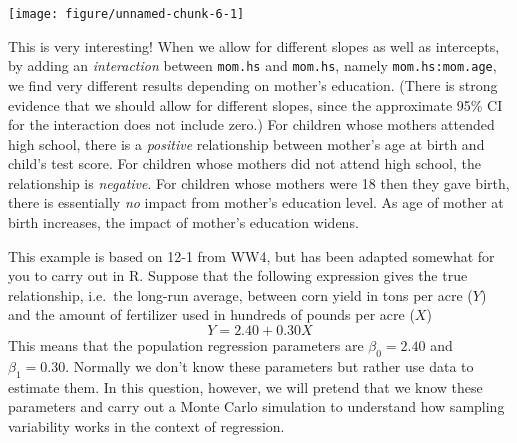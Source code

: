 \documentclass[addpoints,12pt]{exam}\usepackage[]{graphicx}\usepackage[]{color}
\makeatletter
\def\maxwidth{ %
  \ifdim\Gin@nat@width>\linewidth
    \linewidth
  \else
    \Gin@nat@width
  \fi
}
\newcommand{\hlnum}[1]{\textcolor[rgb]{0.686,0.059,0.569}{#1}}%
\newcommand{\hlopt}[1]{\textcolor[rgb]{0,0,0}{#1}}%
\newcommand{\hlstd}[1]{\textcolor[rgb]{0.345,0.345,0.345}{#1}}%
\newcommand{\hlkwa}[1]{\textcolor[rgb]{0.161,0.373,0.58}{\textbf{#1}}}%
\newcommand{\hlkwb}[1]{\textcolor[rgb]{0.69,0.353,0.396}{#1}}%
\newcommand{\hlkwc}[1]{\textcolor[rgb]{0.333,0.667,0.333}{#1}}%
\newcommand{\hlkwd}[1]{\textcolor[rgb]{0.737,0.353,0.396}{\textbf{#1}}}%
\newenvironment{kframe}{%
 \def\at@end@of@kframe{}%
 \ifinner\ifhmode%
  \def\at@end@of@kframe{\end{minipage}}%
  \begin{minipage}{\columnwidth}%
 \fi\fi%
 \def\FrameCommand##1{\hskip\@totalleftmargin \hskip-\fboxsep
 \colorbox{shadecolor}{##1}\hskip-\fboxsep
     \hskip-\linewidth \hskip-\@totalleftmargin \hskip\columnwidth}%
 \MakeFramed {\advance\hsize-\width
   \@totalleftmargin\z@ \linewidth\hsize
   \@setminipage}}%
 {\par\unskip\endMakeFramed%
 \at@end@of@kframe}
\newenvironment{knitrout}{}{} %
\makeatother
\begin{document}
\begin{questions}
\begin{parts}
\begin{solution}
\begin{knitrout}
{\centering \texttt{[image: figure/unnamed-chunk-6-1]} 

}



\end{knitrout}
  This is very interesting! When we allow for different slopes as well as intercepts, by adding an \emph{interaction} between \texttt{mom.hs} and \texttt{mom.hs}, namely \texttt{mom.hs:mom.age}, we find very different results depending on mother's education. (There is strong evidence that we should allow for different slopes, since the approximate 95\% CI for the interaction does not include zero.)  For children whose mothers attended high school, there is a \emph{positive} relationship between mother's age at birth and child's test score. For children whose mothers did not attend high school, the relationship is \emph{negative}. For children whose mothers were 18 then they gave birth, there is essentially \emph{no} impact from mother's education level. As age of mother at birth increases, the impact of mother's education widens. 
  \end{solution}
  \end{parts}
  
  
  \question This example is based on 12-1 from WW4, but has been adapted somewhat for you to carry out in R. Suppose that the following expression gives the true relationship, i.e.\ the long-run average, between corn yield in tons per acre ($Y$) and the amount of fertilizer used in hundreds of pounds per acre ($X$)
  $$Y = 2.40 + 0.30 X$$
    This means that the population regression parameters are $\beta_0 = 2.40$ and $\beta_1 = 0.30$. Normally we don't know these parameters but rather use data to estimate them. In this question, however, we will pretend that we know these parameters and carry out a Monte Carlo simulation to understand how sampling variability works in the context of regression.
\end{questions}
\end{document}
